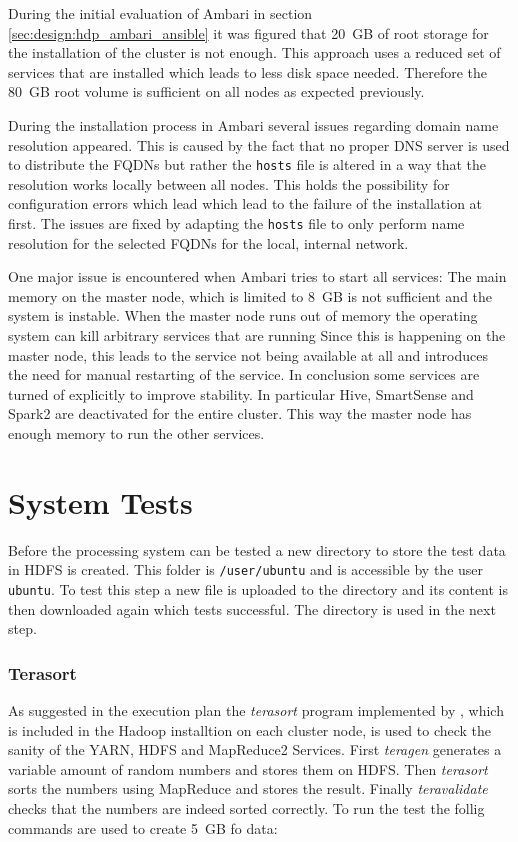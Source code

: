 During the initial evaluation of Ambari in section \vref{sec:design:hdp_ambari_ansible} it was figured that 20~\ac{GB} of root storage for the installation of the cluster is not enough. This approach uses a reduced set of services that are installed which leads to less disk space needed. Therefore the 80~\ac{GB} root volume is sufficient on all nodes as expected previously.

During the installation process in Ambari several issues regarding domain name resolution appeared.
This is caused by the fact that no proper \ac{DNS} server is used to distribute the \acp{FQDN} 
but rather the \texttt{hosts} file is altered in a way that the resolution works locally between all nodes. 
This holds the possibility for configuration errors which lead which lead to the failure of the installation at first.
The issues are fixed by adapting the \texttt{hosts} file to only perform name resolution for the selected \acp{FQDN} for the local, internal network. 

One major issue is encountered when Ambari tries to start all services: The main memory on the master node, which is limited to 8~\ac{GB} is not sufficient and the system is instable.
When the master node runs out of memory the operating system can kill arbitrary services that are running
Since this is happening on the master node, this leads to the service not being available at all and introduces the need for manual restarting of the service.
In conclusion some services are turned of explicitly to improve stability. 
In particular Hive, SmartSense and Spark2 are deactivated for the entire cluster. 
This way the master node has enough memory to run the other services.

\section{System Tests}

Before the processing system can be tested a new directory to store the test data in \ac{HDFS}
is created. 
This folder is \texttt{/user/ubuntu} and is accessible by the user \texttt{ubuntu}.
To test this step a new file is uploaded to the directory and its content is then downloaded again which tests successful. The directory is used in the next step.

\subsubsection{Terasort}

As suggested in the execution plan the \emph{terasort} program implemented by \textcite{omally2008terasort}, which is included in the Hadoop installtion on each cluster node, is used to check the sanity of the \ac{YARN}, \ac{HDFS} and MapReduce2 Services.
First \emph{teragen} generates a variable amount of random numbers and stores them on \ac{HDFS}. Then \emph{terasort} sorts the numbers using MapReduce and stores the result.
Finally \emph{teravalidate} checks that the numbers are indeed sorted correctly.
To run the test the follig commands are used to create 5~\ac{GB} fo data:

